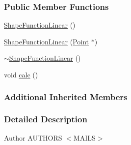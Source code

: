 \subsubsection*{Public Member Functions}
\begin{DoxyCompactItemize}
\item 
\hyperlink{classmknix_1_1_shape_function_linear_a2ef730865bc31699bbaa81c98e5f475b}{Shape\-Function\-Linear} ()
\item 
\hyperlink{classmknix_1_1_shape_function_linear_a0f6389aa088eb1d0fcaedcb3adbf0e2b}{Shape\-Function\-Linear} (\hyperlink{classmknix_1_1_point}{Point} $\ast$)
\item 
\hyperlink{classmknix_1_1_shape_function_linear_a8922b26c916d8befb3f568f91b6cd388}{$\sim$\-Shape\-Function\-Linear} ()
\item 
void \hyperlink{classmknix_1_1_shape_function_linear_a10cfcd17fcdd6482e7f36b3eaaa9fb9c}{calc} ()
\end{DoxyCompactItemize}
\subsubsection*{Additional Inherited Members}


\subsubsection{Detailed Description}
\begin{DoxyAuthor}{Author}
A\-U\-T\-H\-O\-R\-S $<$\-M\-A\-I\-L\-S$>$ 
\end{DoxyAuthor}


